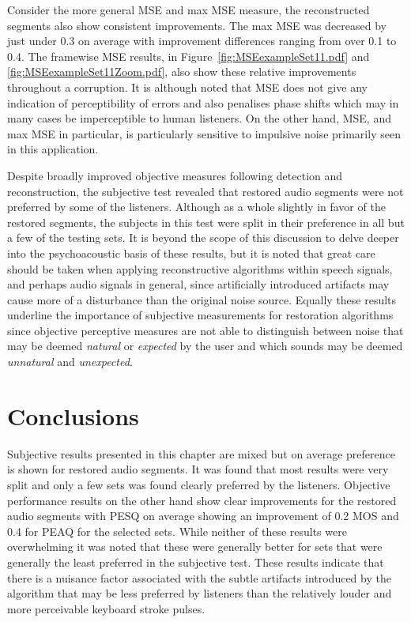 Consider the more general MSE and max MSE measure, the reconstructed segments also show consistent improvements. The max MSE was decreased by just under 0.3 on average with improvement differences ranging from over 0.1 to 0.4. The framewise MSE results, in Figure~\ref{fig:MSEexampleSet11.pdf} and \ref{fig:MSEexampleSet11Zoom.pdf}, also show these relative improvements throughout a corruption. It is although noted that MSE does not give any indication of perceptibility of errors and also penalises phase shifts which may in many cases be imperceptible to human listeners. On the other hand, MSE, and max MSE in particular, is particularly sensitive to impulsive noise primarily seen in this application.


Despite broadly improved objective measures following detection and reconstruction, the subjective test revealed that restored audio segments were not preferred by some of the listeners. Although as a whole slightly in favor of the restored segments, the subjects in this test were split in their preference in all but a few of the testing sets. It is beyond the scope of this discussion to delve deeper into the psychoacoustic basis of these results, but it is noted that great care should be taken when applying reconstructive algorithms within speech signals, and perhaps audio signals in general, since artificially introduced artifacts may cause more of a disturbance than the original noise source. Equally these results underline the importance of subjective measurements for restoration algorithms since objective perceptive measures are not able to distinguish between noise that may be deemed \emph{natural} or \emph{expected} by the user and which sounds may be deemed \emph{unnatural} and \emph{unexpected}.

\section{Conclusions}
Subjective results presented in this chapter are mixed but on average preference is shown for restored audio segments. It was found that most results were very split and only a few sets was found clearly preferred by the listeners. Objective performance results on the other hand show clear improvements for the restored audio segments with PESQ on average showing an improvement of 0.2 MOS and 0.4 for PEAQ for the selected sets. While neither of these results were overwhelming it was noted that these were generally better for sets that were generally the least preferred in the subjective test. These results indicate that there is a nuisance factor associated with the subtle artifacts introduced by the algorithm that may be less preferred by listeners than the relatively louder and more perceivable keyboard stroke pulses. 

